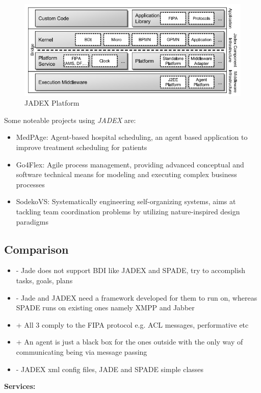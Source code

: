\documentclass[a4paper, 11pt]{article}
\begin{document}
\begin{figure}[H]
	\caption{JADEX Platform}
	\centering
	\includegraphics[scale=0.7]{./images/jadex_platform.png}
\end{figure}

\clearpage

\noindent Some noteable projects using \textit{JADEX} are:
\begin{itemize}
	\item MedPAge: Agent-based hospital scheduling, an agent based application to improve treatment scheduling for patients
	\item Go4Flex: Agile process management, providing advanced conceptual and software technical means for modeling and executing complex business processes
	\item SodekoVS: Systematically engineering self-organizing systems, aims at tackling team coordination problems by utilizing nature-inspired design paradigms
\end{itemize}



\subsection{Comparison}

\begin{itemize}
	\item - Jade does not support BDI like JADEX and SPADE, try to accomplish tasks, goals, plans
	\item - Jade and JADEX need a framework developed for them to run on, whereas SPADE runs on existing ones namely XMPP and Jabber
	\item + All 3 comply to the FIPA protocol e.g. ACL messages, performative etc
	\item + An agent is just a black box for the ones outside with the only way of communicating being via message passing
	\item - JADEX xml config files, JADE and SPADE simple classes
\end{itemize}

\noindent \textbf{Services:} \\
 

\end{document}
